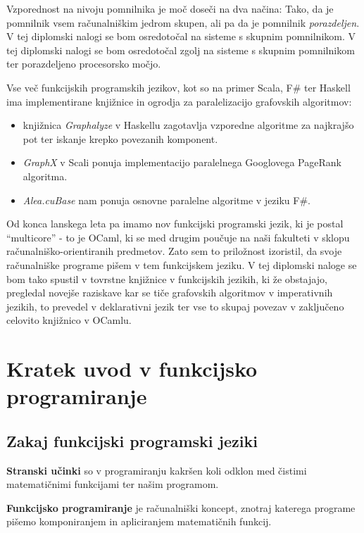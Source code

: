 \documentclass[mat1, tisk]{fmfdelo}
\begin{document}
Vzporednost na nivoju pomnilnika je moč doseči na dva načina: 
Tako, da je pomnilnik vsem računalniškim jedrom skupen, ali pa da je pomnilnik \textit{porazdeljen}. 
V tej diplomski nalogi se bom osredotočal na sisteme s skupnim pomnilnikom. 
V tej diplomski nalogi se bom osredotočal zgolj na sisteme s skupnim pomnilnikom ter porazdeljeno procesorsko močjo.

Vse več funkcijskih programskih jezikov, kot so na primer Scala, F\# ter Haskell ima implementirane knjižnice in ogrodja za paralelizacijo grafovskih algoritmov:
\begin{itemize}
    \item knjižnica \textit{Graphalyze} v Haskellu zagotavlja vzporedne algoritme za najkrajšo pot ter iskanje krepko povezanih komponent.
    \item \textit{GraphX} v Scali ponuja implementacijo paralelnega Googlovega PageRank algoritma.
    \item \textit{Alea.cuBase} nam ponuja osnovne paralelne algoritme v jeziku F\#.
\end{itemize}

Od konca lanskega leta pa imamo nov funkcijski programski jezik, ki je postal ``multicore'' - to je OCaml, ki se med drugim poučuje na naši fakulteti v sklopu računalniško-orientiranih predmetov. 
Zato sem to priložnost izoristil, da svoje računalniške programe pišem v tem funkcijskem jeziku. 
V tej diplomski naloge se bom tako spustil v tovrstne knjižnice v funkcijskih jezikih, ki že obstajajo, 
pregledal novejše raziskave kar se tiče grafovskih algoritmov v imperativnih jezikih, to prevedel v deklarativni jezik ter vse to skupaj povezav v zaključeno celovito knjižnico v OCamlu.

\section{Kratek uvod v funkcijsko programiranje}

\subsection{Zakaj funkcijski programski jeziki}

\begin{definicija}
\textbf{Stranski učinki} so v programiranju kakršen koli odklon med čistimi matematičnimi funkcijami ter našim programom.
\end{definicija}

\begin{definicija}
  \textbf{Funkcijsko programiranje} je računalniški koncept, znotraj katerega programe pišemo komponiranjem in apliciranjem matematičnih funkcij. 
\end{definicija}
\end{document}
